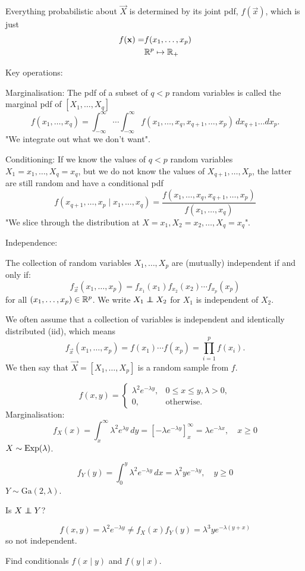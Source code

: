 \documentclass[10pt, a4paper]{article}
\begin{document}
Everything probabilistic about $\vec{X}$ is determined by its joint pdf,
$f(\vec{x})$,
which is just
\begin{align*}
    f(\mathbf{x}) = &f(x_1, \dotsc, x_p) \\
    &\mathbb{R} ^ p \mapsto \mathbb{R}_{+}
\end{align*}

Key operations:

Marginalisation:
The pdf of a subset of $q < p$ random variables is called the marginal pdf of $[X_1, \dotsc, X_q]$
\[
f(x_1, \dotsc, x_q) = \int_{-\infty}^{\infty}\dotsi\int_{-\infty}^{\infty}f(x_1, \dotsc, x_q, x_{q + 1}, \dotsc, x_p)\,dx_{q + 1}\dotsc dx_p.
\]
"We integrate out what we don't want".

Conditioning:
If we know the values of $q < p$ random variables $X_1 = x_1, \dotsc, X_q = x_q$,
but we do not know the values of $X_{q + 1}, \dotsc, X_p$,
the latter are still random and have a conditional pdf
\[
f(x_{q + 1}, \dotsc, x_p\mid x_1, \dotsc, x_q) = \frac{f(x_1, \dotsc, x_q, x_{q + 1}, \dotsc, x_p)}{f(x_1, \dotsc, x_q)}
\]
"We slice through the distribution at $X = x_1, X_2 = x_2, \dotsc, X_q = x_q$".

Independence:

The collection of random variables $X_1, \dotsc, X_p$ are
(mutually)
independent if and only if:
\[
f_{\vec{x}}(x_1, \dotsc, x_p) = f_{x_1}(x_1)f_{x_2}(x_2) \dotsi f_{x_p}(x_p)
\]
for all $(x_1, \dotsc, x_p) \in \mathbb{R} ^ p$.
We write $X_1 \independent X_2$ for $X_1$ is independent of $X_2$.

We often assume that a collection of variables is independent and identically distributed
(iid),
which means
\[
f_{\vec{x}}(x_1, \dotsc, x_p) = f(x_1) \cdots f(x_p) = \prod_{i = 1}^{p}f(x_i).
\]
We then say that $\vec{X} = [X_1, \dotsc, X_p]$ is a random sample from $f$.

\begin{example}
    \[
    f(x, y) = \begin{cases}
        \lambda ^ 2e ^ {-\lambda y}, &0 \leq x \leq y, \lambda > 0, \\
        0, &\text{otherwise}.
    \end{cases}
    \]
    Marginalisation:
    \[
    f_X(x) = \int_{x}^{\infty}\lambda ^ 2e ^ {\lambda y}\,dy = \left[-\lambda e ^ {-\lambda y}\right]_{x}^{\infty} = \lambda e ^ {-\lambda x}, \quad x \geq 0
    \]
    $X \sim \operatorname{Exp}(\lambda)$.

    \[
    f_Y(y) = \int_{0}^{y}\lambda ^ 2e ^ {-\lambda y}\,dx = \lambda ^ 2ye ^ {-\lambda y},\quad y \geq 0
    \]
    $Y \sim \mathrm{Ga}(2, \lambda)$.

    Is $X \independent Y$?

    \[
    f(x, y) = \lambda ^ 2e ^ {-\lambda y} \neq f_X(x)f_Y(y) = \lambda ^ 3ye ^ {-\lambda(y + x)}
    \]
    so not independent.

    Find conditionals $f(x\mid y)$ and $f(y\mid x)$.
\end{example}
\end{document}
